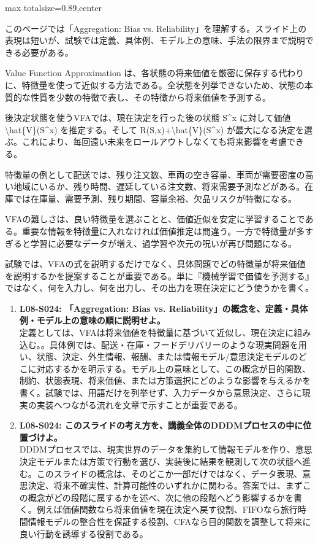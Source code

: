 \begin{minipage}[t]{0.58\textwidth}
\begin{adjustbox}{max totalsize={\textwidth}{0.89\textheight},center}
\begin{minipage}{\textwidth}\scriptsize
{}このページでは「Aggregation: Bias vs. Reliability」を理解する。スライド上の表現は短いが、試験では定義、具体例、モデル上の意味、手法の限界まで説明できる必要がある。\par
Value Function Approximation は、各状態の将来価値を厳密に保存する代わりに、特徴量を使って近似する方法である。全状態を列挙できないため、状態の本質的な性質を少数の特徴で表し、その特徴から将来価値を予測する。\par
後決定状態を使うVFAでは、現在決定を行った後の状態 S\textasciicircum{}x に対して価値 \textbackslash{}hat\{V\}(S\textasciicircum{}x) を推定する。そして R(S,x)+\textbackslash{}hat\{V\}(S\textasciicircum{}x) が最大になる決定を選ぶ。これにより、毎回遠い未来をロールアウトしなくても将来影響を考慮できる。\par
特徴量の例として配送では、残り注文数、車両の空き容量、車両が需要密度の高い地域にいるか、残り時間、遅延している注文数、将来需要予測などがある。在庫では在庫量、需要予測、残り期間、容量余裕、欠品リスクが特徴になる。\par
VFAの難しさは、良い特徴量を選ぶことと、価値近似を安定に学習することである。重要な情報を特徴量に入れなければ価値推定は間違う。一方で特徴量が多すぎると学習に必要なデータが増え、過学習や次元の呪いが再び問題になる。\par
試験では、VFAの式を説明するだけでなく、具体問題でどの特徴量が将来価値を説明するかを提案することが重要である。単に『機械学習で価値を予測する』ではなく、何を入力し、何を出力し、その出力を現在決定にどう使うかを書く。\par{}\begin{enumerate}\item \textbf{L08-S024: 「Aggregation: Bias vs. Reliability」の概念を、定義・具体例・モデル上の意味の順に説明せよ。}\\定義としては、VFAは将来価値を特徴量に基づいて近似し、現在決定に組み込む。。具体例では、配送・在庫・フードデリバリーのような現実問題を用い、状態、決定、外生情報、報酬、または情報モデル/意思決定モデルのどこに対応するかを明示する。モデル上の意味として、この概念が目的関数、制約、状態表現、将来価値、または方策選択にどのような影響を与えるかを書く。試験では、用語だけを列挙せず、入力データから意思決定、さらに現実の実装へつながる流れを文章で示すことが重要である。\item \textbf{L08-S024: このスライドの考え方を、講義全体のDDDMプロセスの中に位置づけよ。}\\DDDMプロセスでは、現実世界のデータを集約して情報モデルを作り、意思決定モデルまたは方策で行動を選び、実装後に結果を観測して次の状態へ進む。このスライドの概念は、そのどこか一部だけではなく、データ表現、意思決定、将来不確実性、計算可能性のいずれかに関わる。答案では、まずこの概念がどの段階に属するかを述べ、次に他の段階へどう影響するかを書く。例えば価値関数なら将来価値を現在決定へ戻す役割、FIFOなら旅行時間情報モデルの整合性を保証する役割、CFAなら目的関数を調整して将来に良い行動を誘導する役割である。\end{enumerate}

\end{minipage}
\end{adjustbox}
\end{minipage}
